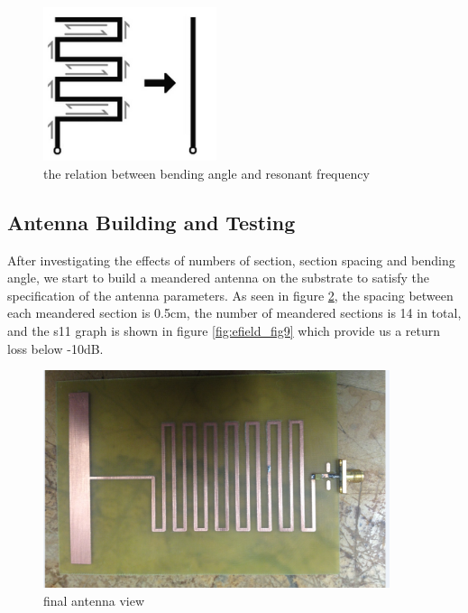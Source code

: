 \begin{figure}[h]
	\begin{center}
		\includegraphics[width=2in]{./images/efield_image5.png}
		\caption{the relation between bending angle and resonant frequency}
		\label{fig:efield_fig7}
	\end{center}
\end{figure}

\subsection{Antenna Building and Testing}

After investigating the effects of numbers of section, section spacing and bending angle, we start to build a meandered antenna on the substrate to satisfy the specification of the antenna parameters. As seen in figure \ref{fig:efield_fig8}, the spacing between each meandered section is 0.5cm, the number of meandered sections is 14 in total, and the s11 graph is shown in figure \ref{fig:efield_fig9} which provide us a return loss below -10dB.

\begin{figure}[h]
	\begin{center}
		\includegraphics[width=4in]{./images/efield_image6.png}
		\caption{final antenna view}
		\label{fig:efield_fig8}
	\end{center}
\end{figure}

